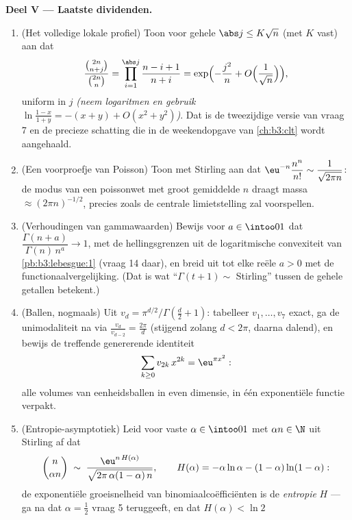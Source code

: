 \begin{problem}
\medskip
\noindent\textbf{Deel V --- Laatste dividenden.}
\begin{enumerate}[resume]
  \item (Het volledige lokale profiel) Toon voor gehele $\abs j
        \leq K\sqrt n$ (met $K$ vast) aan dat
        \[
        \frac{\binom{2n}{n+j}}{\binom{2n}{n}} =
        \prod_{i=1}^{\abs j}\frac{n - i + 1}{n + i}
        = \exp\Bigl(-\frac{j^2}n +
        O\Bigl(\frac1{\sqrt n}\Bigr)\Bigr),
        \]
        uniform in $j$ \emph{(neem logaritmen en gebruik $\ln
        \frac{1-x}{1+y} = -(x + y) + O(x^2 + y^2)$)}. Dat is de
        tweezijdige versie van vraag 7 en de precieze schatting
        die in de weekendopgave van \cref{ch:b3:clt} wordt
        aangehaald.
  \item (Een voorproefje van Poisson) Toon met Stirling aan dat
        $\eu^{-n}\dfrac{n^n}{n!} \sim \dfrac1{\sqrt{2\pi n}}$: de
        modus van een poissonwet met groot gemiddelde $n$ draagt
        massa $\approx (2\pi n)^{-1/2}$, precies zoals de centrale
        limietstelling zal voorspellen.
  \item (Verhoudingen van gammawaarden) Bewijs voor $a \in
        \intoo01$ dat $\dfrac{\Gamma(n + a)}{\Gamma(n)\,n^a} \to
        1$, met de hellingsgrenzen uit de logaritmische
        convexiteit van \cref{pb:b3:lebesgue:1} (vraag 14 daar),
        en breid uit tot elke reële $a > 0$ met de
        functionaalvergelijking. (Dat is wat ``$\Gamma(t+1) \sim$
        Stirling'' tussen de gehele getallen betekent.)
  \item (Ballen, nogmaals) Uit $v_d = \pi^{d/2}/\Gamma(\frac d2 +
        1)$: tabelleer $v_1, \dots, v_7$ exact, ga de
        unimodaliteit na via $\frac{v_d}{v_{d-2}} = \frac{2\pi}d$
        (stijgend zolang $d < 2\pi$, daarna dalend), en bewijs de
        treffende genererende identiteit
        \[
        \sum_{k\geq0}v_{2k}\,x^{2k} = \eu^{\pi x^2} :
        \]
        alle volumes van eenheidsballen in even dimensie, in één
        exponentiële functie verpakt.
  \item (Entropie-asymptotiek) Leid voor vaste $\alpha \in
        \intoo01$ met $\alpha n \in \N$ uit Stirling af dat
        \[
        \binom{n}{\alpha n} \;\sim\;
        \frac{\eu^{n\,H(\alpha)}}
        {\sqrt{2\pi\,\alpha(1-\alpha)\,n}},
        \qquad
        H(\alpha) = -\alpha\ln\alpha -
        (1-\alpha)\ln(1-\alpha) :
        \]
        de exponentiële groeisnelheid van binomiaalcoëfficiënten
        is de \emph{entropie} $H$ --- ga na dat $\alpha =
        \frac12$ vraag 5 teruggeeft, en dat $H(\alpha) < \ln2$

\end{enumerate}
\end{problem}
